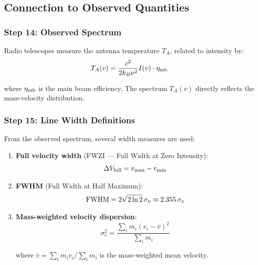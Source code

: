 \documentclass[twocolumn,amsmath,amssymb,prd,superscriptaddress,nofootinbib]{revtex4-2}
\begin{document}
\subsection{Connection to Observed Quantities}

\subsubsection{Step 14: Observed Spectrum}

Radio telescopes measure the antenna temperature $T_A$, related to intensity by:
\begin{equation}
    T_A(v) = \frac{c^2}{2k_B\nu^2} I(v) \cdot \eta_{\rm mb}
    \label{eq:T_A}
\end{equation}

where $\eta_{\rm mb}$ is the main beam efficiency. The spectrum $T_A(v)$ directly reflects the mass-velocity distribution.

\subsubsection{Step 15: Line Width Definitions}

From the observed spectrum, several width measures are used:

\begin{enumerate}
    \item \textbf{Full velocity width} (FWZI --- Full Width at Zero Intensity):
    \begin{equation}
        \Delta V_{\rm full} = v_{\rm max} - v_{\rm min}
        \label{eq:delta_v_full}
    \end{equation}

    \item \textbf{FWHM} (Full Width at Half Maximum):
    \begin{equation}
        {\rm FWHM} = 2\sqrt{2\ln 2} \, \sigma_v \approx 2.355 \, \sigma_v
        \label{eq:fwhm}
    \end{equation}

    \item \textbf{Mass-weighted velocity dispersion}:
    \begin{equation}
        \boxed{\sigma_v^2 = \frac{\sum_i m_i (v_i - \bar{v})^2}{\sum_i m_i}}
        \label{eq:sigma_mass}
    \end{equation}

    where $\bar{v} = \sum_i m_i v_i / \sum_i m_i$ is the mass-weighted mean velocity.
\end{enumerate}
\end{document}
